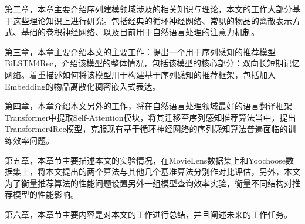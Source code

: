 第二章，本章主要介绍序列建模领域涉及的相关知识与理论，本文的工作大部分基于这些理论知识上进行研究。包括经典的循环神经网络、常见的物品的离散表示方式、基础的卷积神经网络、以及目前用于自然语言处理的注意力机制。

第三章，本章主要介绍本文的主要工作：提出一个用于序列感知的推荐模型BiLSTM4Rec，介绍该模型的整体情况，包括该模型的核心部分：双向长短期记忆网络。着重描述如何将该模型用于构建基于序列感知的推荐框架，包括加入Embedding的物品离散化稠密嵌入式表达。


第四章，本章介绍本文另外的工作，将在自然语言处理领域最好的语言翻译框架Transformer中提取Self-Attention模块，将其迁移至序列感知推荐算法当中，提出Transformer4Rec模型，克服现有基于循环神经网络的序列感知算法普遍面临的训练效率问题。

第五章，本章节主要描述本文的实验情况，在MovieLens数据集上和Yoochoose数据集上，将本文提出的两个算法与其他几个基准算法分别作对比评估，另外，本文为了衡量推荐算法的性能问题设置另外一组模型查询效率实验，衡量不同结构对推荐模型的性能影响。

第六章，本章节主要内容是对本文的工作进行总结，并且阐述未来的工作任务。
